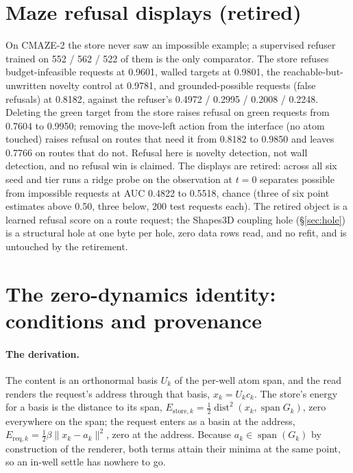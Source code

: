 \documentclass{article} %
\begin{document}
\section{Maze refusal displays (retired)}
\label{app:mazerefusal}

On CMAZE-2 the store never saw an impossible example; a supervised refuser trained on 552 / 562 /
522 of them is the only comparator. The store refuses budget-infeasible requests at 0.9601, walled
targets at 0.9801, the reachable-but-unwritten novelty control at 0.9781, and grounded-possible
requests (false refusals) at 0.8182, against the refuser's 0.4972 / 0.2995 / 0.2008 / 0.2248.
Deleting the green target from the store raises refusal on green requests from 0.7604 to 0.9950;
removing the move-left action from the interface (no atom touched) raises refusal on routes that
need it from 0.8182 to 0.9850 and leaves 0.7766 on routes that do not.
Refusal here is novelty detection, not wall detection, and no refusal win is claimed. The displays
are retired: across all six seed and tier runs a ridge probe on the observation at $t=0$ separates
possible from impossible requests at AUC 0.4822 to 0.5518, chance (three of six point estimates above 0.50, three below, 200 test requests each). The retired object is a learned
refusal score on a route request; the Shapes3D coupling hole (\S\ref{sec:hole}) is a structural
hole at one byte per hole, zero data rows read, and no refit, and is untouched by the retirement.

\section{The zero-dynamics identity: conditions and provenance}
\label{app:clue}

\paragraph{The derivation.} The content is an orthonormal basis $U_k$ of the
per-well atom span, and the read renders the request's address through that basis,
$x_k=U_k c_k$. The store's energy for a basis is the distance to its span,
$E_{\text{store},k}=\tfrac12\operatorname{dist}^2(x_k,\operatorname{span}G_k)$, zero everywhere
on the span; the request enters as a basin at the address, $E_{\text{req},k}=\tfrac12\beta\lVert
x_k-a_k\rVert^2$, zero at the address. Because $a_k\in\operatorname{span}(G_k)$ by construction
of the renderer, both terms attain their minima at the same point, so an in-well settle has
nowhere to go. 
\end{document}
